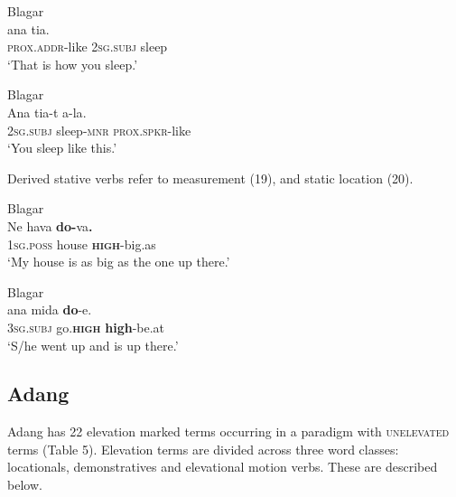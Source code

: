 \ea%
\label{ex:17}
   Blagar \citep{Steinhauer2012}   \\
    ana  tia. \\
   \textsc{prox.addr}{}-like  \textsc{2sg.subj} sleep \\
\glt   `That is how you sleep.'
\z



 \ea%
\label{ex:18}
   Blagar \citep{Steinhauer2012}   \\
\gll Ana  tia-t  {{\textglotstop}}{a-la}{{\ng}}{.} \\
  \textsc{2sg.subj} sleep-\textsc{mnr} \textsc{prox.spkr}{}-like  \\
\glt   `You sleep like this.'
\z





Derived stative verbs refer to measurement (19), and static location (20).



\ea%
\label{ex:19}
   Blagar \citep{Steinhauer2012}   \\
\gll  Ne   hava  \textbf{{do-}}{va{\ng}}\textbf{{.}} \\
   \textsc{1sg.poss} house  \textbf{\textsc{high}}\textsc{{}-}big.as  \\
\glt   `My house is as big as the one up there.'
\z









\ea%
\label{ex:20}
   Blagar \citep{Steinhauer2012}   \\
\gll  {\textglotstop}ana  mida  \textbf{do}-{\textglotstop}e.  \\
  \textsc{3sg.subj} go.\textbf{\textsc{high}} \textbf{high}-be.at     \\
\glt   `S/he went up and is up there.'
\z







\subsection{Adang }
Adang has 22 elevation marked terms occurring in a paradigm with \textsc{unelevated} terms (Table 5). Elevation terms are divided across three word classes: locationals, demonstratives and elevational motion verbs. These are described below.

